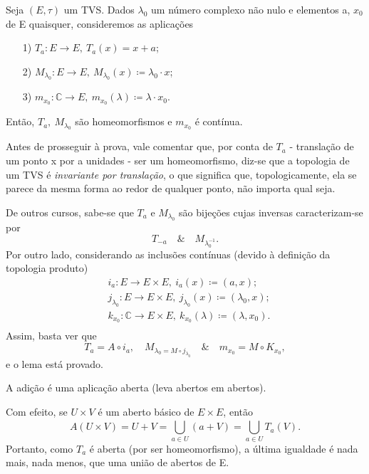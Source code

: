 \documentclass[../distribution_theory_notes.tex]{subfiles}
\begin{document}
\begin{lemma*}
	Seja \((E, \tau )\) um TVS. Dados \(\lambda_{0}\) um número complexo não nulo e elementos a, \(x_{0}\) de E quaisquer, consideremos as aplicações
	\begin{itemize}
		\item[1)] \(T_{a}:E\rightarrow E,\: T_{a}(x) = x + a\);
		\item[2)] \(M_{\lambda_{0}}:E\rightarrow E,\: M_{\lambda_{0}}(x)\coloneqq \lambda_{0}\cdot x\);
		\item[3)] \(m_{x_{0}}:\mathbb{C}\rightarrow E,\: m_{x_{0}}(\lambda)\coloneqq \lambda \cdot x_{0}\).
	\end{itemize}
	Então, \(T_{a},\: M_{\lambda_{0}} \) são homeomorfismos e \(m_{x_{0}}\) é contínua.
\end{lemma*}
Antes de prosseguir à prova, vale comentar que, por conta de \(T_{a}\) - translação de um ponto x por a unidades - ser um homeomorfismo,
diz-se que a topologia de um TVS é \textit{invariante por translação}, o que significa que, topologicamente,
ela se parece da mesma forma ao redor de qualquer ponto, não importa qual seja.
\begin{proof*}
	De outros cursos, sabe-se que \(T_{a}\) e \(M_{\lambda_{0}}\) são bijeções cujas inversas caracterizam-se por
	\[
		T_{-a} \quad\&\quad M_{\lambda_{0}^{-1}}.
	\]
	Por outro lado, considerando as inclusões contínuas (devido à definição da topologia produto)
	\begin{align*}
		 & i_{a}:E\rightarrow E\times E,\: i_{a}(x)\coloneqq (a, x);                                   \\
		 & j_{\lambda_{0}}:E\rightarrow E\times E,\: j_{\lambda_{0}}(x)\coloneqq (\lambda_{0}, x);     \\
		 & k_{x_{0}}:\mathbb{C}\rightarrow E\times E,\: k_{x_{0}}(\lambda )\coloneqq (\lambda, x_{0}). \\
	\end{align*}
	Assim, basta ver que
	\[
		T_{a} = A\circ i_{a},\quad M_{\lambda_{0} = M\circ j_{\lambda_{0}} }\quad\&\quad m_{x_{0}} = M\circ K_{x_{0}},
	\]
	e o lema está provado. \qedsymbol
\end{proof*}
\begin{crl*}
	A adição é uma aplicação aberta (leva abertos em abertos).
\end{crl*}
\begin{proof*}
	Com efeito, se \(U\times V\) é um aberto básico de \(E\times E\), então
	\[
		A(U\times V) = U + V = \bigcup_{a\in U}^{}(a+V) = \bigcup_{a\in U}^{}T_{a}(V).
	\]
	Portanto, como \(T_{a}\) é aberta (por ser homeomorfismo), a última igualdade é nada mais, nada menos, que uma união de abertos de E. \qedsymbol
\end{proof*}
\end{document}
